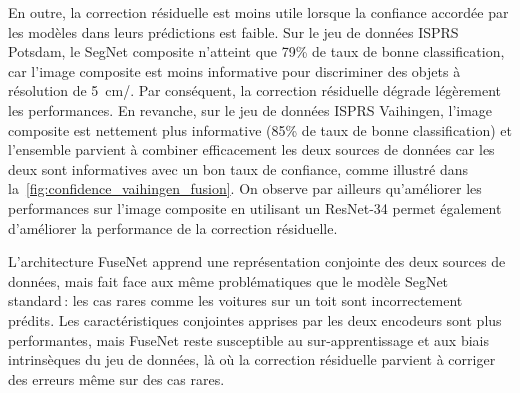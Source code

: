 En outre, la correction résiduelle est moins utile lorsque la confiance accordée par les modèles dans leurs prédictions est faible. Sur le jeu de données \gls{ISPRS} Potsdam, le SegNet composite n'atteint que 79\% de taux de bonne classification, car l'image composite est moins informative pour discriminer des objets à résolution de \SI{5}{\centi\meter/\px}. Par conséquent, la correction résiduelle dégrade légèrement les performances. En revanche, sur le jeu de données \gls{ISPRS} Vaihingen, l'image composite est nettement plus informative (85\% de taux de bonne classification) et l'ensemble parvient à combiner efficacement les deux sources de données car les deux sont informatives avec un bon taux de confiance, comme illustré dans la~\cref{fig:confidence_vaihingen_fusion}. On observe par ailleurs qu'améliorer les performances sur l'image composite en utilisant un ResNet-34 permet également d'améliorer la performance de la correction résiduelle.

L'architecture FuseNet apprend une représentation conjointe des deux sources de données, mais fait face aux même problématiques que le modèle SegNet standard\,: les cas rares comme les voitures sur un toit sont incorrectement prédits. Les caractéristiques conjointes apprises par les deux encodeurs sont plus performantes, mais FuseNet reste susceptible au sur-apprentissage et aux biais intrinsèques du jeu de données, là où la correction résiduelle parvient à corriger des erreurs même sur des cas rares.

